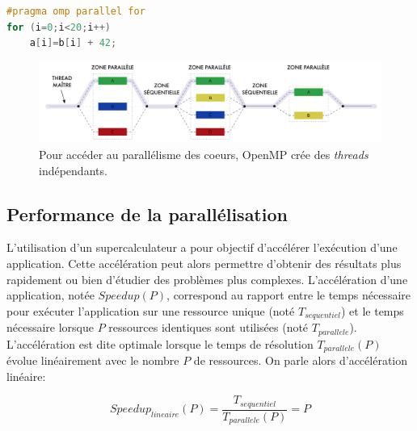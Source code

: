           
            
\begin{lstlisting}[language=C, caption=Distribution des itérations d'une boucle à l'aide d'OpenMP, label=lst:openmp]
#pragma omp parallel for
for (i=0;i<20;i++)
    a[i]=b[i] + 42;
\end{lstlisting}

                \begin{figure}
                \center
                \includegraphics[width=14cm]{images/openmp.png}
                \caption{\label{fig:openmp} Pour accéder au parallélisme des coeurs, OpenMP crée des \textit{threads} indépendants\protect\footnotemark.}
                \end{figure}
                

\subsection{Performance de la parallélisation}
\label{sec:parallele_perf}
    
        L'utilisation d'un supercalculateur a pour objectif d'accélérer l'exécution d'une application. Cette accélération peut alors permettre d'obtenir des résultats plus rapidement ou bien d'étudier des problèmes plus complexes. L'accélération d'une application, notée $Speedup(P)$, correspond au rapport entre le temps nécessaire pour exécuter l'application sur une ressource unique (noté $T_{sequentiel}$) et le temps nécessaire lorsque $P$ ressources identiques sont utilisées (noté $T_{parallele}$). L'accélération est dite optimale lorsque le temps de résolution $T_{parallele}(P)$ évolue linéairement avec le nombre $P$ de ressources. On parle alors d'accélération linéaire:
        
        \begin{equation}
        \label{eq_speedup}
        Speedup_{lineaire} (P) = \frac{T_{sequentiel}}{T_{parallele}(P)} = P
        \end{equation}
        
